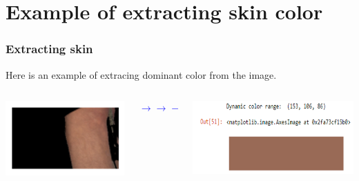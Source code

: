\documentclass[10pt,pdf]{beamer}
\begin{document}
\section{Example of extracting skin color}
\begin{frame}
\frametitle{Extracting skin}
Here is an example of extracing dominant color from the image.
\begin{columns}
    \begin{column}{0.4\textwidth}
    \includegraphics[width=\textwidth,scale=1]{pres1.png}
    \end{column}
    \begin{column}{0.3\textwidth}
    \LARGE
    \textcolor{blue}{$\rightarrow\rightarrow\rightarrow\rightarrow\rightarrow$\\}
    \normalsize
    \end{column}
    \begin{column}{0.35\textwidth}
    \includegraphics[width=\textwidth]{pres2.png}
    \end{column}
\end{columns}
\end{frame}
\end{document}
